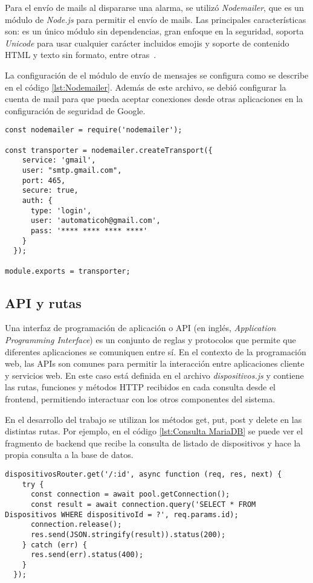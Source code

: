 Para el envío de mails al dispararse una alarma, se utilizó \textit{Nodemailer}, que es un módulo de \textit{Node.js} para permitir el envío de mails. Las principales características son: es un único módulo sin dependencias, gran enfoque en la seguridad, soporta \textit{Unicode} para usar cualquier carácter incluidos emojis y soporte de contenido HTML y texto sin formato, entre otras\ \citep{28}.

La configuración de el módulo de envío de mensajes se configura como se describe en el código \ref{lst:Nodemailer}. Además de este archivo, se debió configurar la cuenta de mail para que pueda aceptar conexiones desde otras aplicaciones en la configuración de seguridad de Google.

\begin{lstlisting}[caption={Configuración del módulo de envío de mails.}, label={lst:Nodemailer}]
const nodemailer = require('nodemailer');

const transporter = nodemailer.createTransport({
    service: 'gmail',
    user: "smtp.gmail.com",
    port: 465,
    secure: true,
    auth: {
      type: 'login',
      user: 'automaticoh@gmail.com',
      pass: '**** **** **** ****'
    }
  });

module.exports = transporter;
\end{lstlisting}

\subsection{API y rutas}

Una interfaz de programación de aplicación o API (en inglés, \textit{Application Programming Interface}) es un conjunto de reglas y protocolos que permite que diferentes aplicaciones se comuniquen entre sí. En el contexto de la programación web, las APIs son comunes para permitir la interacción entre aplicaciones cliente y servicios web. En este caso está definida en el archivo \textit{dispositivos.js} y contiene las rutas, funciones y métodos HTTP recibidos en cada consulta desde el frontend, permitiendo interactuar con los otros componentes del sistema.

En el desarrollo del trabajo se utilizan los métodos get, put, post y delete en las distintas rutas. Por ejemplo, en el código \ref{lst:Consulta MariaDB} se puede ver el fragmento de backend que recibe la consulta de listado de dispositivos y hace la propia consulta a la base de datos.

\begin{lstlisting}[caption={Consulta de listado de dispositivos al backend.}, label={lst:Consulta MariaDB}]
dispositivosRouter.get('/:id', async function (req, res, next) {
    try {
      const connection = await pool.getConnection();
      const result = await connection.query('SELECT * FROM Dispositivos WHERE dispositivoId = ?', req.params.id);
      connection.release();
      res.send(JSON.stringify(result)).status(200);
    } catch (err) {
      res.send(err).status(400);
    }
  });
\end{lstlisting}


